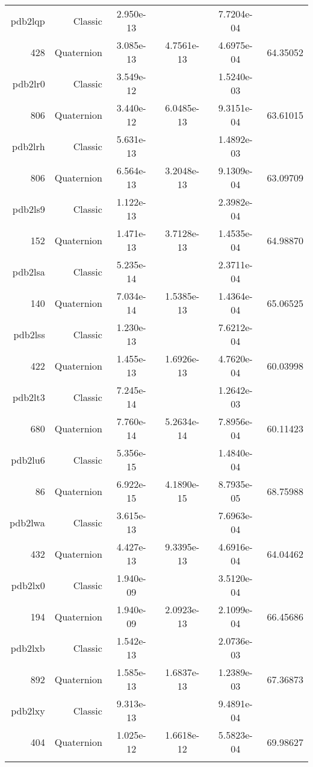 \begin{xltabular}{\textwidth}{r|rS[table-format=1.3e+2]S[table-format=1.4e+2]S[table-format=1.4e+2]S[table-format=-1.5]}
pdb2lqp & Classic & 2.950e-13 &  & 7.7204e-04 & \\
428 & Quaternion & 3.085e-13 & 4.7561e-13 & 4.6975e-04 & 64.35052\\  \addlinespace
pdb2lr0 & Classic & 3.549e-12 &  & 1.5240e-03 & \\
806 & Quaternion & 3.440e-12 & 6.0485e-13 & 9.3151e-04 & 63.61015\\  \addlinespace
pdb2lrh & Classic & 5.631e-13 &  & 1.4892e-03 & \\
806 & Quaternion & 6.564e-13 & 3.2048e-13 & 9.1309e-04 & 63.09709\\  \addlinespace
pdb2ls9 & Classic & 1.122e-13 &  & 2.3982e-04 & \\
152 & Quaternion & 1.471e-13 & 3.7128e-13 & 1.4535e-04 & 64.98870\\  \addlinespace
pdb2lsa & Classic & 5.235e-14 &  & 2.3711e-04 & \\
140 & Quaternion & 7.034e-14 & 1.5385e-13 & 1.4364e-04 & 65.06525\\  \addlinespace
pdb2lss & Classic & 1.230e-13 &  & 7.6212e-04 & \\
422 & Quaternion & 1.455e-13 & 1.6926e-13 & 4.7620e-04 & 60.03998\\  \addlinespace
pdb2lt3 & Classic & 7.245e-14 &  & 1.2642e-03 & \\
680 & Quaternion & 7.760e-14 & 5.2634e-14 & 7.8956e-04 & 60.11423\\  \addlinespace
pdb2lu6 & Classic & 5.356e-15 &  & 1.4840e-04 & \\
86 & Quaternion & 6.922e-15 & 4.1890e-15 & 8.7935e-05 & 68.75988\\  \addlinespace
pdb2lwa & Classic & 3.615e-13 &  & 7.6963e-04 & \\
432 & Quaternion & 4.427e-13 & 9.3395e-13 & 4.6916e-04 & 64.04462\\  \addlinespace
pdb2lx0 & Classic & 1.940e-09 &  & 3.5120e-04 & \\
194 & Quaternion & 1.940e-09 & 2.0923e-13 & 2.1099e-04 & 66.45686\\  \addlinespace
pdb2lxb & Classic & 1.542e-13 &  & 2.0736e-03 & \\
892 & Quaternion & 1.585e-13 & 1.6837e-13 & 1.2389e-03 & 67.36873\\  \addlinespace
pdb2lxy & Classic & 9.313e-13 &  & 9.4891e-04 & \\
404 & Quaternion & 1.025e-12 & 1.6618e-12 & 5.5823e-04 & 69.98627\\  \addlinespace

\end{xltabular}
